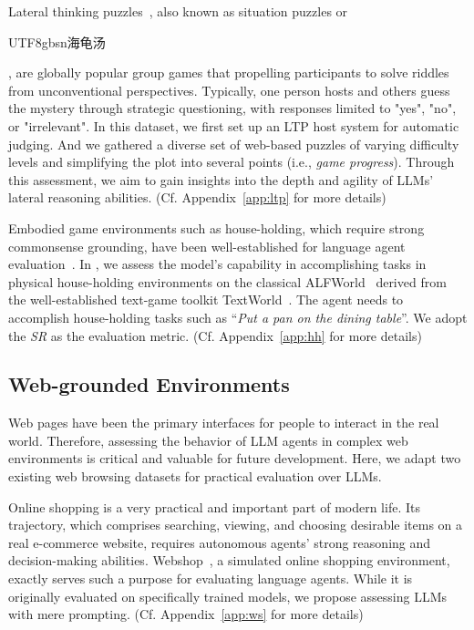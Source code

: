 Lateral thinking puzzles~\citep{sloane1992lateral, de1970lateral}, also known as situation puzzles or \begin{CJK}{UTF8}{gbsn}海龟汤\end{CJK}, are globally popular group games that propelling participants to solve riddles from unconventional perspectives.
Typically, one person hosts and others guess the mystery through strategic questioning, with responses limited to "yes", "no", or "irrelevant".
In this dataset, we first set up an LTP host system for automatic judging.
And we gathered a diverse set of web-based puzzles of varying difficulty levels and simplifying the plot into several points (i.e., \textit{game progress}).
Through this assessment, we aim to gain insights into the depth and agility of LLMs' lateral reasoning abilities.
(Cf. Appendix~\ref{app:ltp} for more details)



Embodied game environments such as house-holding, which require strong commonsense grounding, have been well-established for language agent evaluation~\citep{cote2019textworld}.
In \model, we assess the model's capability in accomplishing tasks in physical house-holding environments on the classical ALFWorld~\citep{shridhar2020alfworld} derived from the well-established text-game toolkit TextWorld~\citep{cote2019textworld}.
The agent needs to accomplish house-holding tasks such as ``\textit{Put a pan on the dining table}''.
We adopt the \textit{SR} as the evaluation metric. (Cf. Appendix~\ref{app:hh} for more details)


\subsection{Web-grounded Environments}
Web pages have been the primary interfaces for people to interact in the real world.
Therefore, assessing the behavior of LLM agents in complex web environments is critical and valuable for future development.
Here, we adapt two existing web browsing datasets for practical evaluation over LLMs.

Online shopping is a very practical and important part of modern life.
Its trajectory, which comprises searching, viewing, and choosing desirable items on a real e-commerce website, requires autonomous agents' strong reasoning and decision-making abilities. 
Webshop~\citep{yao2022webshop}, a simulated online shopping environment, exactly serves such a purpose for evaluating language agents. 
While it is originally evaluated on specifically trained models, we propose assessing LLMs with mere prompting. (Cf. Appendix~\ref{app:ws} for more details)

